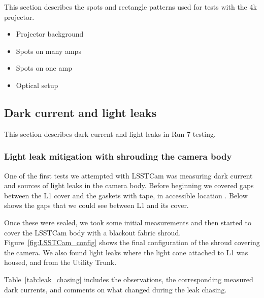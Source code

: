 This section describes the spots and rectangle patterns used for tests with the 4k
projector.

\begin{itemize}
\tightlist
\item
  Projector background
\item
  Spots on many amps
\item
  Spots on one amp
\item
  Optical setup
\end{itemize}

\subsection{Dark current and light
leaks}\label{dark-current-and-light-leaks}

This section describes dark current and light leaks in Run 7 testing.

\subsubsection{Light leak mitigation with shrouding the camera
body}\label{light-leak-mitigation-with-shrouding-the-camera-body}

One of the first tests we attempted with LSSTCam was measuring dark
current and sources of light leaks in the camera body. Before beginning we covered gaps between the L1 cover and the gaskets with tape, in accessible location . Below shows the gaps that we could see between L1 and its cover.

Once these were sealed, we took some initial measurements and then
started to cover the LSSTCam body with a blackout fabric shroud. Figure~\ref{fig:LSSTCam_config} shows the final configuration of the shroud covering the
camera.
We also found light leaks
where the light cone attached to L1 was housed, and from the Utility
Trunk. 


Table~\ref{tab:leak_chasing} includes the observations, the corresponding measured dark
currents, and comments on what changed during the leak chasing.

